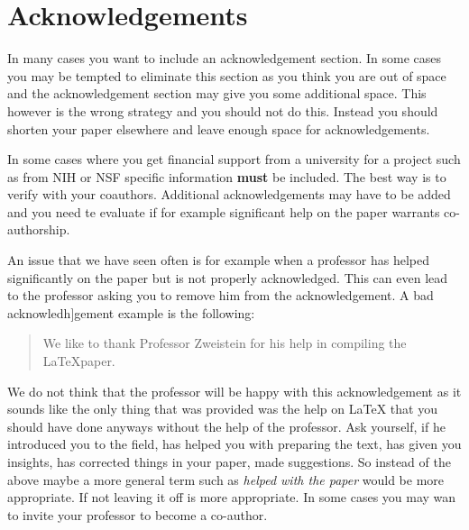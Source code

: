 \FILENAME

\section{Acknowledgements}
\label{S:acknowledgements}

In many cases you want to include an acknowledgement section. In some cases you may be tempted to eliminate this section as you think you are out of space and the acknowledgement section may give you some additional space. This however is the wrong strategy and you should not do this. Instead you should shorten your paper elsewhere and leave enough space for acknowledgements.

In some cases where you get financial support from a university for a project such as from NIH or NSF specific information {\bf must} be included. The best way is to verify with your coauthors. Additional acknowledgements may have to be added and you need te evaluate if for example significant help on the paper warrants co-authorship.

An issue that we have seen often is for example when a professor has helped significantly on the paper but is not properly acknowledged. This can even lead to the professor asking you to remove him from the acknowledgement. A bad acknowledh]gement example is the following:

\begin{quote}
We like to thank Professor Zweistein for his help in compiling  the \LaTeX paper.
\end{quote}

We do not think that the professor will be happy with this acknowledgement as it sounds like the only thing that was provided was the help on LaTeX that you should have done anyways without the help of the professor. Ask yourself, if he introduced you to the field, has helped you with preparing the text, has given you insights, has corrected things in your paper, made suggestions. So instead of the above maybe a more general term such as {\em helped with the paper} would be more appropriate. If not leaving it off is more appropriate. In some cases you may wan to invite your professor to become a co-author. 